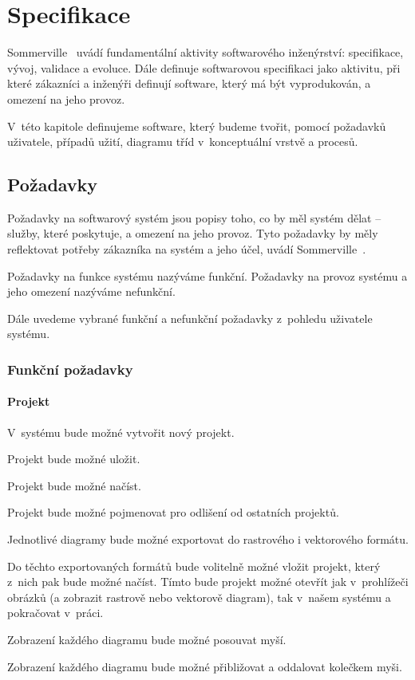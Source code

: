 \chapter{Specifikace}

Sommerville~\cite{sommerville_software_2011} %
uvádí fundamentální aktivity softwarového inženýrství: specifikace, vývoj, validace a evoluce.
Dále definuje softwarovou specifikaci jako aktivitu, při které zákazníci a inženýři definují software, který má být vyprodukován, a omezení na jeho provoz. %

V~této kapitole definujeme software, který budeme tvořit, pomocí požadavků uživatele, případů užití, diagramu tříd v~konceptuální vrstvě a procesů.

\section{Požadavky}

Požadavky na softwarový systém jsou popisy toho, co by měl systém dělat -- služby, které poskytuje, a omezení na jeho provoz.
Tyto požadavky by měly reflektovat potřeby zákazníka na systém a jeho účel, uvádí Sommerville~\cite[s.~83]{sommerville_software_2011}. %

Požadavky na funkce systému nazýváme funkční.
Požadavky na provoz systému a jeho omezení nazýváme nefunkční.

Dále uvedeme vybrané funkční a nefunkční požadavky z~pohledu uživatele systému.

\subsection{Funkční požadavky}

\subsubsection*{Projekt}

\begin{enumfp}
    \item V~systému bude možné vytvořit nový projekt.
    \item Projekt bude možné uložit.
    \item Projekt bude možné načíst.
    \item Projekt bude možné pojmenovat pro odlišení od ostatních projektů.
    \item Jednotlivé diagramy bude možné exportovat do rastrového i vektorového formátu.
    \item Do těchto exportovaných formátů bude volitelně možné vložit projekt, který z~nich pak bude možné načíst.
        Tímto bude projekt možné otevřít jak v~prohlížeči obrázků (a zobrazit rastrově nebo vektorově diagram), tak v~našem systému a pokračovat v~práci.
    \item Zobrazení každého diagramu bude možné posouvat myší.
    \item Zobrazení každého diagramu bude možné přibližovat a oddalovat kolečkem myši.
\end{enumfp}

